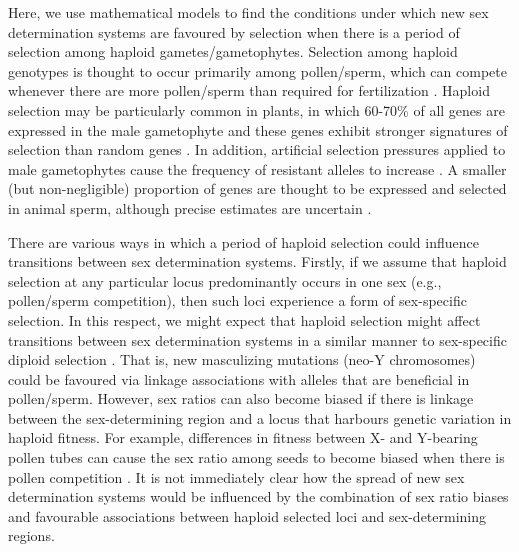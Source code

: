 \documentclass[12pt]{article}
\begin{document}

Here, we use mathematical models to find the conditions under which new sex determination systems are favoured by selection when there is a period of selection among haploid gametes/gametophytes. 
Selection among haploid genotypes is thought to occur primarily among pollen/sperm, which can compete whenever there are more pollen/sperm than required for fertilization \citep{Mulcahy:1996ha,JOSEPH:2004haa}. 
Haploid selection may be particularly common in plants, in which 60-70\% of all genes are expressed in the male gametophyte and these genes exhibit stronger signatures of selection than random genes \citep{Borg:2009jpa,Arunkumar:2013iq,Gossmann:2014dua}.
In addition, artificial selection pressures applied to male gametophytes cause the frequency of resistant alleles to increase \citep[e.g.,][]{Hormaza:1996cv,Ravikumar:2003uo,Hedhly:2004iv,Clarke:2004ir}. 
A smaller (but non-negligible) proportion of genes are thought to be expressed and selected in animal sperm, although precise estimates are uncertain \citep{Zheng:2001fi,JOSEPH:2004haa,Vibranovski:2010et}.

There are various ways in which a period of haploid selection could influence transitions between sex determination systems. 
Firstly, if we assume that haploid selection at any particular locus predominantly occurs in one sex (e.g., pollen/sperm competition), then such loci experience a form of sex-specific selection. 
In this respect, we might expect that haploid selection might affect transitions between sex determination systems in a similar manner to sex-specific diploid selection \citep[as explored by][]{vanDoorn:2007eu,vanDoorn:2010hu}. 
That is, new masculizing mutations (neo-Y chromosomes) could be favoured via linkage associations with alleles that are beneficial in pollen/sperm. 
However, sex ratios can also become biased if there is linkage between the sex-determining region and a locus that harbours genetic variation in haploid fitness. 
For example, differences in fitness between X- and Y-bearing pollen tubes can cause the sex ratio among seeds to become biased when there is pollen competition \citep{Lloyd:1974tz,Conn:1981uw,Stehlik:2005ul,Stehlik:2006to,Field:2012fd,Field:2013cc}.
It is not immediately clear how the spread of new sex determination systems would be influenced by the combination of sex ratio biases and favourable associations between haploid selected loci and sex-determining regions. 
\end{document}
